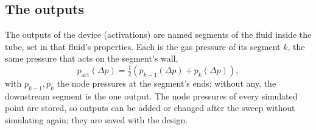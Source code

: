 \documentclass[11pt,a4paper]{article}
\theoremstyle{remark}
\begin{document}
\subsection{The outputs}\label{sec:output}
The outputs of the device (activations) are named segments of the fluid inside the tube, set in that
fluid's properties. Each is the gas pressure of its segment $k$, the same pressure that acts on the
segment's wall,
\begin{equation}
  p_\mathrm{act}(\Delta p) = \tfrac12\left(p_{k-1}(\Delta p) + p_k(\Delta p)\right),
\end{equation}
with $p_{k-1}, p_k$ the node pressures at the segment's ends; without any, the downstream segment is
the one output. The node pressures of every simulated point are stored, so outputs can be added or
changed after the sweep without simulating again; they are saved with the design.
\end{document}
